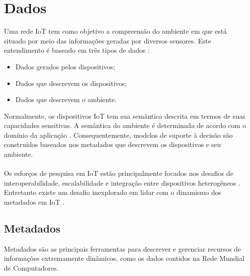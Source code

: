 \section{Dados}%
	\quad Uma rede \acrlong{IoT} tem como objetivo a compreensão do ambiente em que está situado por meio das informações geradas por diversos
  sensores. Este entendimento é baseado em três tipos de dados \cite{SemIOT}:
  \begin{itemize}
    \item Dados gerados pelos dispositivos;
    \item Dados que descrevem os dispositivos;
    \item Dados que descrevem o ambiente.
  \end{itemize}
  \quad Normalmente, os dispositivos \acrshort{IoT} tem sua semântica descrita em termos de suas capacidades sensitivas. A semântica do ambiente
  é determinada de acordo com o domínio da aplicação \cite{IOTdata}. Consequentemente, modelos de suporte à decisão são construídos
  baseados nos metadados que descrevem os dispositivos e seu ambiente.
  \\\\ \null
  \quad
  Os esforços de pesquisa em \acrlong{IoT} estão principalmente focados nos desafios de interoperabilidade, escalabilidade e integração entre dispositivos heterogêneos \cite{IOTdata}.
  Entretanto existe um desafio inexplorado em lidar com o dinamismo dos metadados em \acrshort{IoT} \cite{collaborative}.

	\subsection{Metadados}
  \quad Metadados são as principais ferramentas para descrever e gerenciar recursos de informações extremamente dinâmicos, como os dados
  contidos na Rede Mundial de Computadores.
